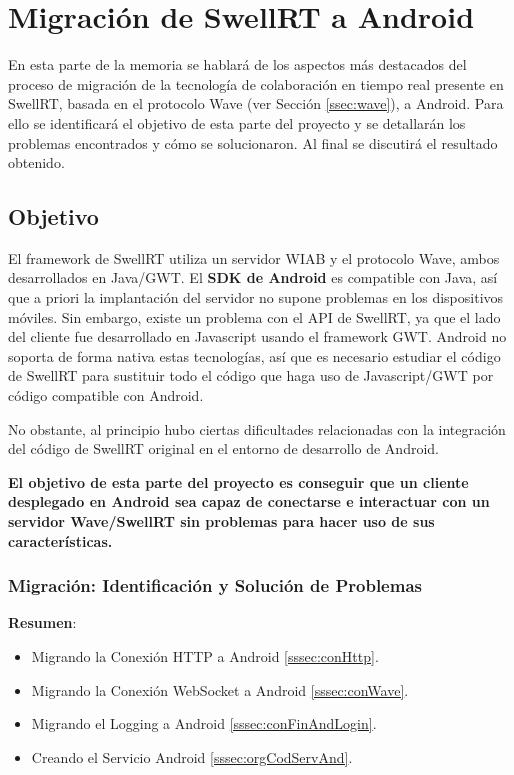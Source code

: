 \newpage
\thispagestyle{sectioned}
\chapter{Migración de SwellRT a Android}

	En esta parte de la memoria se hablará de los aspectos más destacados del proceso de migración de la tecnología de colaboración en tiempo real presente en SwellRT, basada en el protocolo Wave (ver Sección \ref{ssec:wave}), a Android. Para ello se identificará el objetivo de esta parte del proyecto y se detallarán los problemas encontrados y cómo se solucionaron. Al final se discutirá el resultado obtenido. 

  \section{Objetivo} \label{sec:migration}
  
    El framework de SwellRT utiliza un servidor WIAB y el protocolo Wave, ambos desarrollados en Java/GWT. El \textbf{SDK de Android} \cite{ref:android_sdk} es compatible con Java, así que a priori la implantación del servidor no supone problemas en los dispositivos móviles. Sin embargo, existe un problema con el API de SwellRT, ya que el lado del cliente fue desarrollado en Javascript usando el framework GWT. Android no soporta de forma nativa estas tecnologías, así que es necesario estudiar el código de SwellRT para sustituir todo el código que haga uso de Javascript/GWT por código compatible con Android. 
    
    No obstante, al principio hubo ciertas dificultades relacionadas con la integración del código de SwellRT original en el entorno de desarrollo de Android. 
    
    
    \textbf{El objetivo de esta parte del proyecto es conseguir que un cliente desplegado en Android sea capaz de conectarse e interactuar con un servidor Wave/SwellRT sin problemas para hacer uso de sus características.}  

	\subsection{Migración: Identificación y Solución de Problemas}	
	
	\textbf{Resumen}:
	
	\begin{itemize}
	  \item Migrando la Conexión HTTP a Android \ref{sssec:conHttp}.
	  \item Migrando la Conexión WebSocket a Android \ref{sssec:conWave}.
	  \item Migrando el Logging a Android \ref{sssec:conFinAndLogin}.
	  \item Creando el Servicio Android \ref{sssec:orgCodServAnd}.
	\end{itemize}
	
